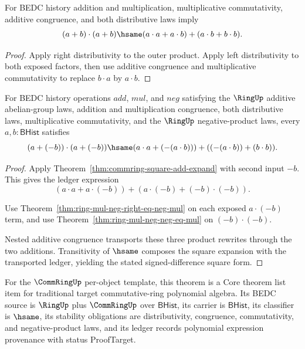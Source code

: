 \begin{theorem}
\label{thm:commring-square-add-expand}
For BEDC history addition and multiplication, multiplicative commutativity,
additive congruence, and both distributive laws imply
$$
(a+b)\cdot(a+b)\hsame (a\cdot a+a\cdot b)+(a\cdot b+b\cdot b).
$$
\end{theorem}
\begin{proof}
Apply right distributivity to the outer product. Apply left distributivity to
both exposed factors, then use additive congruence and multiplicative
commutativity to replace \(b\cdot a\) by \(a\cdot b\).
\end{proof}

\begin{theorem}
\label{thm:commring-square-signed-difference-expand}
For BEDC history operations $add$, $mul$, and $neg$ satisfying the $\RingUp$
additive abelian-group laws, addition and multiplication congruence, both
distributive laws, multiplicative commutativity, and the $\RingUp$
negative-product laws, every $a,b : \mathsf{BHist}$ satisfies
$$
(a+(-b))\cdot(a+(-b))\hsame
(a\cdot a+(-(a\cdot b)))+((-(a\cdot b))+(b\cdot b)).
$$
\end{theorem}
\begin{proof}
Apply Theorem~\ref{thm:commring-square-add-expand} with second input $-b$.
This gives the ledger expression
$$
(a\cdot a+a\cdot(-b))+(a\cdot(-b)+(-b)\cdot(-b)).
$$

Use Theorem~\ref{thm:ring-mul-neg-right-eq-neg-mul} on each exposed
$a\cdot(-b)$ term, and use Theorem~\ref{thm:ring-mul-neg-neg-eq-mul} on
$(-b)\cdot(-b)$.

Nested additive congruence transports these three product rewrites through the
two additions. Transitivity of $\hsame$ composes the square expansion with the
transported ledger, yielding the stated signed-difference square form.
\end{proof}

For the $\CommRingUp$ per-object template, this theorem is a Core theorem list
item for traditional target commutative-ring polynomial algebra. Its BEDC source
is $\RingUp$ plus $\CommRingUp$ over $\mathsf{BHist}$, its carrier is
$\mathsf{BHist}$, its classifier is $\hsame$, its stability obligations are
distributivity, congruence, commutativity, and negative-product laws, and its
ledger records polynomial expression provenance with status ProofTarget.

